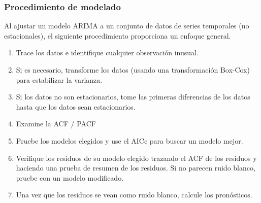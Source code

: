 \documentclass[10pt]{beamer}
\begin{document}





\begin{frame}[fragile]
\frametitle{Procedimiento de modelado}


Al ajustar un modelo ARIMA a un conjunto de datos de series temporales (no estacionales), el siguiente procedimiento proporciona un enfoque general.

{\small
\begin{enumerate}
\item Trace los datos e identifique cualquier observación inusual.
\item Si es necesario, transforme los datos (usando una transformación Box-Cox) para estabilizar la varianza.
\item Si los datos no son estacionarios, tome las primeras diferencias de los datos hasta que los datos sean estacionarios.
\item Examine la ACF / PACF
\item Pruebe los modelos elegidos y use el AICc para buscar un modelo mejor.
\item Verifique los residuos de su modelo elegido trazando el ACF de los residuos y haciendo una prueba de resumen de los residuos. Si no parecen ruido blanco, pruebe con un modelo modificado.
\item Una vez que los residuos se vean como ruido blanco, calcule los pronósticos.
\end{enumerate}
}

\end{frame}


\end{document}
